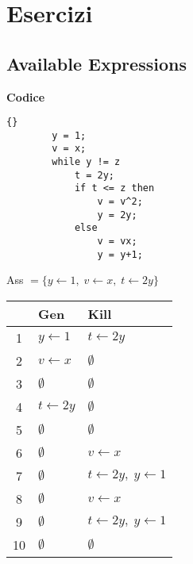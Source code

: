 \documentclass[a4paper,12pt,openany]{article}
\begin{document}
    \newpage
    \section*{Esercizi}
    \subsection*{Available Expressions}
    \begin{multicols}{2}
    \textbf{Codice}
    \begin{lstlisting}{}
        y = 1;
        v = x;
        while y != z
            t = 2y;
            if t <= z then
                v = v^2;
                y = 2y;
            else
                v = vx;
                y = y+1;
    \end{lstlisting}
    \columnbreak
    
    \noindent
    Ass $= \{y\leftarrow1,\;v\leftarrow x,\;t\leftarrow2y\}$\\[0.5em]
    \begin{tabular}{c | l | l}
        & Gen & Kill\\
        \hline
        1  & $y\leftarrow1$ & $t\leftarrow2y$\\
        2  & $v\leftarrow x$ & $\emptyset$\\
        3  & $\emptyset$ & $\emptyset$\\
        4  & $t\leftarrow2y$ & $\emptyset$\\
        5  & $\emptyset$ & $\emptyset$\\
        6  & $\emptyset$ & $v\leftarrow x$\\
        7  & $\emptyset$ & $t\leftarrow2y,\; y\leftarrow1$\\
        8  & $\emptyset$ & $v\leftarrow x$\\
        9  & $\emptyset$ & $t\leftarrow2y,\; y\leftarrow1$\\
        10 & $\emptyset$ & $\emptyset$\\
    \end{tabular}
    \end{multicols}
    
\end{document}

